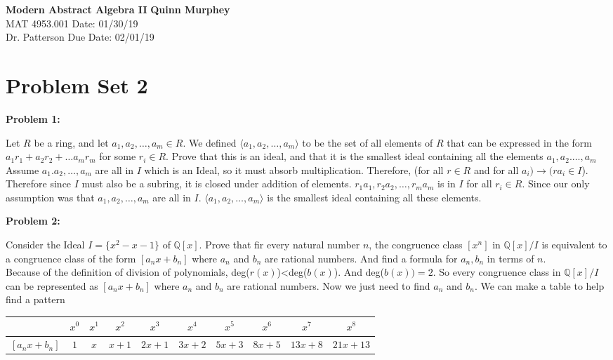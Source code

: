 \documentclass[a4paper, 11pt]{article}
\begin{document}
\noindent
\large\textbf{Modern Abstract Algebra II} \hfill \textbf{Quinn Murphey} \\
\normalsize MAT 4953.001 \hfill Date: 01/30/19 \\
Dr. Patterson \hfill Due Date: 02/01/19 \\
\noindent\makebox[\linewidth]{\rule{\paperwidth}{0.4pt}}

\section*{Problem Set 2}
\doublespacing
\noindent\textbf{Problem 1:}
    
    Let $R$ be a ring, and let $a_1,a_2,\dots ,a_m \in R$. We defined $\langle a_1,a_2,\dots ,a_m\rangle$ to be the set of all elements of $R$ that can be expressed in the form $a_1r_1 + a_2r_2 + \dots a_mr_m$ for some $r_i \in R$. Prove that this is an ideal, and that it is the smallest ideal containing all the elements $a_1,a_2.\dots ,a_m$\\
    
    Assume $a_1.a_2,\dots ,a_m$ are all in $I$ which is an Ideal, so it must absorb multiplication. Therefore, (for all $r\in R$ and for all $a_i)\rightarrow (ra_i \in I$). Therefore since $I$ must also be a subring, it is closed under addition of elements. $r_1a_1, r_2a_2, \dots , r_ma_m$ is in $I$ for all $r_i \in R$. Since our only assumption was that $a_1,a_2,\dots ,a_m$ are all in $I$. $\langle a_1,a_2,\dots ,a_m\rangle$ is the smallest ideal containing all these elements.
    
\noindent\textbf{Problem 2:}
    
    Consider the Ideal $I = \{x^2-x-1\}$ of $\mathbb{Q}[x]$. Prove that fir every natural number $n$, the congruence class $[x^n]$ in $\mathbb{Q}[x]/I$ is equivalent to a congruence class of the form $[a_nx+b_n]$ where $a_n$ and $b_n$ are rational numbers. And find a formula for $a_n,b_n$ in terms of $n$.\\
    
    Because of the definition of division of polynomials, deg($r(x)$)<deg($b(x)$). And deg($b(x)) = 2$. So every congruence class in $\mathbb{Q}[x]/I$ can be represented as $[a_nx+b_n]$ where $a_n$ and $b_n$ are rational numbers. Now we just need to find $a_n$ and $b_n$. We can make a table to help find a pattern\\
    
    \begin{tabular}{ |c|c|c|c|c|c|c|c|c|c| } 
                \hline
                    [$x^n$] & $x^0$ & $x^1$ & $x^2$ & $x^3$ & $x^4$ & $x^5$ & $x^6$ & $x^7$ & $x^8$ \\ 
                \hline
                    $[a_nx+b_n]$ & $1$ & $x$ & $x+1$ & $2x+1$ & $3x+2$ & $5x+3$ & $8x+5$ & $13x+8$ & $21x+13$\\ 
                \hline
            \end{tabular}\\
    
\end{document}
